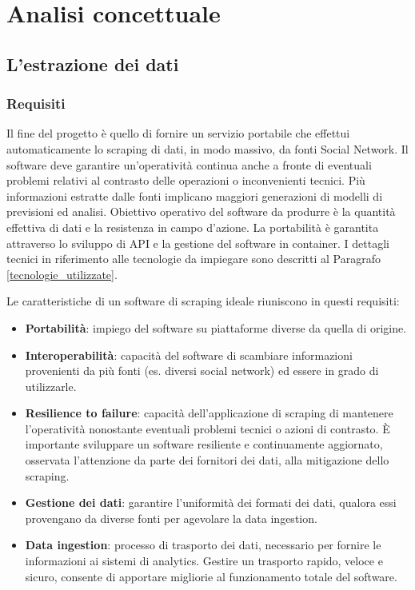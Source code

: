 \chapter{Analisi concettuale}\label{chap:analisi_concettuale}
\section{L'estrazione dei dati}
\subsection{Requisiti}
Il fine del progetto \`e quello di fornire un servizio portabile che effettui automaticamente lo scraping di dati, in modo massivo, da fonti Social Network. Il software deve garantire un'operativit\`a continua anche a fronte di eventuali problemi relativi al contrasto delle operazioni o inconvenienti tecnici.
Pi\`u informazioni estratte dalle fonti implicano maggiori generazioni di modelli di previsioni ed analisi. Obiettivo operativo del software da produrre \`e la quantit\`a effettiva di dati e la resistenza in campo d'azione.
La portabilit\`a \`e garantita attraverso lo sviluppo di API e la gestione del software in container.
I dettagli tecnici in riferimento alle tecnologie da impiegare sono descritti al Paragrafo \ref{tecnologie_utilizzate}.

Le caratteristiche di un software di scraping ideale riuniscono in questi requisiti:
\begin{itemize}
    \item \textbf{Portabilit\`a}: impiego del software su piattaforme diverse da quella di origine.
    \item \textbf{Interoperabilit\`a}: capacit\`a del software di scambiare informazioni provenienti da pi\`u fonti (es. diversi social network) ed essere in grado di utilizzarle.
    \item \textbf{Resilience to failure}: capacit\`a dell'applicazione di scraping di mantenere l'operativit\`a nonostante eventuali problemi tecnici o azioni di contrasto. \`E importante sviluppare un software resiliente e continuamente aggiornato, osservata l'attenzione da parte dei fornitori dei dati, alla mitigazione dello scraping.
    \item \textbf{Gestione dei dati}: garantire l'uniformit\`a dei formati dei dati, qualora essi provengano da diverse fonti per agevolare la data ingestion.
    \item \textbf{Data ingestion}: processo di trasporto dei dati, necessario per fornire le informazioni ai sistemi di analytics. Gestire un trasporto rapido, veloce e sicuro, consente di apportare migliorie al funzionamento totale del software.
\end{itemize}
